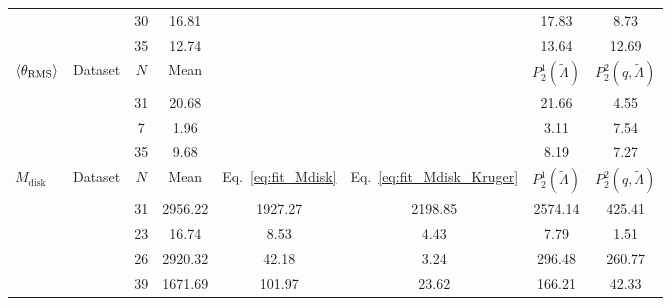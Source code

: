\begin{table}[t]
{\begin{tabular}{l|l|cccccc}
            &  \DSheatcool{}  & 30 & 16.81  & &  & 17.83 & 8.73 \\  
            &  \DScool{}  & 35 & 12.74  & &  & 13.64 & 12.69 \\
            \hline\hline
            $\langle \theta_{\rm RMS}\rangle$ & Dataset & $N$ & Mean & & & $P_2^1(\tilde{\Lambda})$ & $P_2^2(q,\tilde{\Lambda})$ \\ \hline
            & \DSrefset{} & 31 & 20.68 & & & 21.66 & 4.55 \\ 
            &  \DSheatcool{}  & 7 & 1.96 & & & 3.11 & 7.54 \\ 
            &  \DScool{} & 35 & 9.68 & & & 8.19 & 7.27 \\ 
            \hline\hline
            $M_{\text{disk}}$ & Dataset & $N$ & Mean & Eq.~\eqref{eq:fit_Mdisk} & Eq.~\eqref{eq:fit_Mdisk_Kruger} & $P_2^1(\tilde{\Lambda})$ & $P_2^2(q,\tilde{\Lambda})$ \\ \hline
            & \DSrefset{} & 31 & 2956.22 & 1927.27 & 2198.85 & 2574.14 & 425.41 \\ 
            &  \DSheatcool{} & 23 & 16.74 & 8.53 & 4.43 & 7.79 & 1.51 \\ 
            &  \DScool{}  & 26 & 2920.32 & 42.18 & 3.24 & 296.48 & 260.77 \\
            &  \DSnone{}  & 39 & 1671.69 & 101.97 & 23.62 & 166.21 & 42.33 \\
            \hline\hline
        \end{tabular}
    }%
\end{table}



